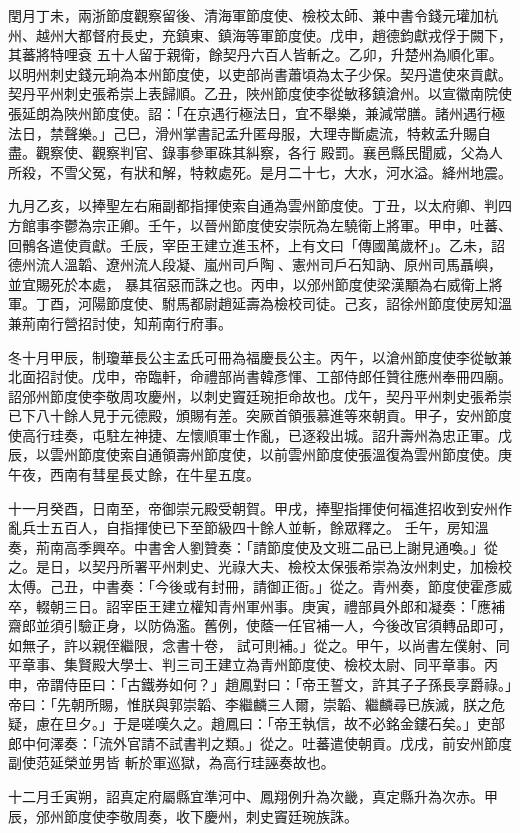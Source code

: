 \begin{pinyinscope}
 閏月丁未，兩浙節度觀察留後、清海軍節度使、檢校太師、兼中書令錢元瓘加杭州、越州大都督府長史，充鎮東、鎮海等軍節度使。戊申，趙德鈞獻戎俘于闕下，其蕃將特哩袞
 五十人留于親衛，餘契丹六百人皆斬之。乙卯，升楚州為順化軍。以明州刺史錢元珦為本州節度使，以吏部尚書蕭頃為太子少保。契丹遣使來貢獻。契丹平州刺史張希崇上表歸順。乙丑，陜州節度使李從敏移鎮滄州。以宣徽南院使張延朗為陜州節度使。詔：「在京遇行極法日，宜不舉樂，兼減常膳。諸州遇行極法日，禁聲樂。」己巳，滑州掌書記孟升匿母服，大理寺斷處流，特敕孟升賜自盡。觀察使、觀察判官、錄事參軍硃其糾察，各行
 殿罰。襄邑縣民聞威，父為人所殺，不雪父冤，有狀和解，特敕處死。是月二十七，大水，河水溢。絳州地震。



 九月乙亥，以捧聖左右廂副都指揮使索自通為雲州節度使。丁丑，以太府卿、判四方館事李鬱為宗正卿。壬午，以晉州節度使安崇阮為左驍衛上將軍。甲申，吐蕃、回鶻各遣使貢獻。壬辰，宰臣王建立進玉杯，上有文曰「傳國萬歲杯」。乙未，詔德州流人溫韜、遼州流人段凝、嵐州司戶陶、憲州司戶石知訥、原州司馬聶嶼，並宜賜死於本處，
 暴其宿惡而誅之也。丙申，以邠州節度使梁漢顒為右威衛上將軍。丁酉，河陽節度使、駙馬都尉趙延壽為檢校司徒。己亥，詔徐州節度使房知溫兼荊南行營招討使，知荊南行府事。



 冬十月甲辰，制瓊華長公主孟氏可冊為福慶長公主。丙午，以滄州節度使李從敏兼北面招討使。戊申，帝臨軒，命禮部尚書韓彥惲、工部侍郎任贊往應州奉冊四廟。詔邠州節度使李敬周攻慶州，以刺史竇廷琬拒命故也。戊午，契丹平州刺史張希崇
 已下八十餘人見于元德殿，頒賜有差。突厥首領張慕進等來朝貢。甲子，安州節度使高行珪奏，屯駐左神捷、左懷順軍士作亂，已逐殺出城。詔升壽州為忠正軍。戊辰，以雲州節度使索自通領壽州節度使，以前雲州節度使張溫復為雲州節度使。庚午夜，西南有彗星長丈餘，在牛星五度。



 十一月癸酉，日南至，帝御崇元殿受朝賀。甲戌，捧聖指揮使何福進招收到安州作亂兵士五百人，自指揮使已下至節級四十餘人並斬，餘眾釋之。
 壬午，房知溫奏，荊南高季興卒。中書舍人劉贊奏：「請節度使及文班二品已上謝見通喚。」從之。是日，以契丹所署平州刺史、光祿大夫、檢校太保張希崇為汝州刺史，加檢校太傅。己丑，中書奏：「今後或有封冊，請御正衙。」從之。青州奏，節度使霍彥威卒，輟朝三日。詔宰臣王建立權知青州軍州事。庚寅，禮部員外郎和凝奏：「應補齋郎並須引驗正身，以防偽濫。舊例，使蔭一任官補一人，今後改官須轉品即可，如無子，許以親侄繼限，念書十卷，
 試可則補。」從之。甲午，以尚書左僕射、同平章事、集賢殿大學士、判三司王建立為青州節度使、檢校太尉、同平章事。丙申，帝謂侍臣曰：「古鐵券如何？」趙鳳對曰：「帝王誓文，許其子子孫長享爵祿。」帝曰：「先朝所賜，惟朕與郭崇韜、李繼麟三人爾，崇韜、繼麟尋已族滅，朕之危疑，慮在旦夕。」于是嗟嘆久之。趙鳳曰：「帝王執信，故不必銘金鏤石矣。」吏部郎中何澤奏：「流外官請不試書判之類。」從之。吐蕃遣使朝貢。戊戌，前安州節度副使范延榮並男皆
 斬於軍巡獄，為高行珪誣奏故也。



 十二月壬寅朔，詔真定府屬縣宜準河中、鳳翔例升為次畿，真定縣升為次赤。甲辰，邠州節度使李敬周奏，收下慶州，刺史竇廷琬族誅。



\end{pinyinscope}